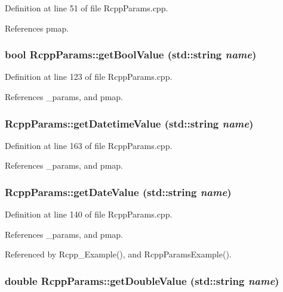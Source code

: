 Definition at line 51 of file RcppParams.cpp.

References pmap.\hypertarget{classRcppParams_ad818a50a0e269360f3f74c5259dec882}{
\subsubsection[{getBoolValue}]{\setlength{\rightskip}{0pt plus 5cm}bool RcppParams::getBoolValue (std::string {\em name})}}
\label{classRcppParams_ad818a50a0e269360f3f74c5259dec882}


Definition at line 123 of file RcppParams.cpp.

References \_\-params, and pmap.\hypertarget{classRcppParams_aa4bec8bfe32d5079e64dc1c9a8fcf1b9}{
\subsubsection[{getDatetimeValue}]{ RcppParams::getDatetimeValue (std::string {\em name})}}
\label{classRcppParams_aa4bec8bfe32d5079e64dc1c9a8fcf1b9}


Definition at line 163 of file RcppParams.cpp.

References \_\-params, and pmap.\hypertarget{classRcppParams_aae20c7ee73aa2f1176837cc9387ad008}{
\subsubsection[{getDateValue}]{ RcppParams::getDateValue (std::string {\em name})}}
\label{classRcppParams_aae20c7ee73aa2f1176837cc9387ad008}


Definition at line 140 of file RcppParams.cpp.

References \_\-params, and pmap.

Referenced by Rcpp\_\-Example(), and RcppParamsExample().\hypertarget{classRcppParams_aa45f8bc1cd8a64aa9a98e24158407077}{
\subsubsection[{getDoubleValue}]{\setlength{\rightskip}{0pt plus 5cm}double RcppParams::getDoubleValue (std::string {\em name})}}
\label{classRcppParams_aa45f8bc1cd8a64aa9a98e24158407077}



